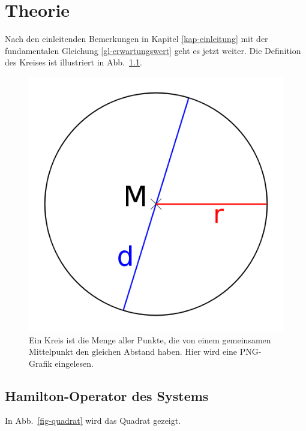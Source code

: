 \chapter{Theorie}
\label{kap-theorie}

Nach den einleitenden Bemerkungen in Kapitel \ref{kap-einleitung} mit der fundamentalen Gleichung 
 \eqref{gl-erwartungswert} geht es jetzt weiter. Die Definition des Kreises ist illustriert 
in Abb.~\ref{fig-kreis}.

\begin{figure}
\includegraphics[width=\mediumfigwidth]{img/kreis.png}
\caption{Ein Kreis ist die Menge aller Punkte, die von einem gemeinsamen Mittelpunkt den gleichen Abstand haben.  Hier wird eine PNG-Grafik eingelesen.}
\label{fig-kreis}
\end{figure} 

\pagebreak
\section{Hamilton-Operator des Systems}
In  Abb.~\ref{fig-quadrat} wird das Quadrat gezeigt.

